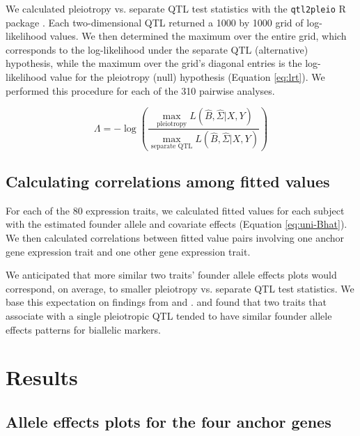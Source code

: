 \documentclass{article}
\begin{document}
We calculated pleiotropy vs. separate QTL test statistics with the \texttt{qtl2pleio} R package \citep{qtl2pleio}. Each two-dimensional QTL returned a 1000 by 1000 grid of log-likelihood values. We then determined the maximum over the entire grid, which corresponds to the log-likelihood under the separate QTL (alternative) hypothesis, while the maximum over the grid's diagonal entries is the log-likelihood value for the pleiotropy (null) hypothesis (Equation \ref{eq:lrt}). We performed this procedure for each of the 310 pairwise analyses.

\begin{equation}\label{eq:lrt}
\Lambda = - \log\left(\frac{\max_{\text{pleiotropy}}L(\hat B, \hat \Sigma | X, Y)}{\max_{\text{separate QTL}}L(\hat B, \hat \Sigma | X, Y)} \right)
\end{equation}




\subsection{Calculating correlations among fitted values}

For each of the 80 expression traits, we calculated fitted values for each subject with the estimated founder allele and covariate effects (Equation \ref{eq:uni-Bhat}). We then calculated correlations between fitted value pairs involving one anchor gene expression trait and one other gene expression trait. 

We anticipated that more similar two traits' founder allele effects plots would correspond, on average, to smaller pleiotropy vs. separate QTL test statistics. We base this expectation on findings from \citet{macdonald2007joint} and \citet{king2012genetic}. \citet{macdonald2007joint} and \citet{king2012genetic} found that two traits that associate with a single pleiotropic QTL tended to have similar founder allele effects patterns for biallelic markers.




\section{Results}

\subsection{Allele effects plots for the four anchor genes}
\end{document}
